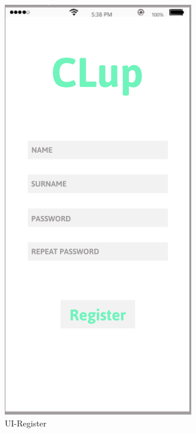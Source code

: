 \documentclass[a4paper,12pt]{report}
\begin{document}
\begin{figure}[H]
\begin{minipage}[t]{0.5\linewidth}
		\includegraphics[scale=0.6]{UI-Register.png}
		\caption{UI-Register}
		\label{UI-Register}
	\end{minipage}
\end{figure}
\end{document}
